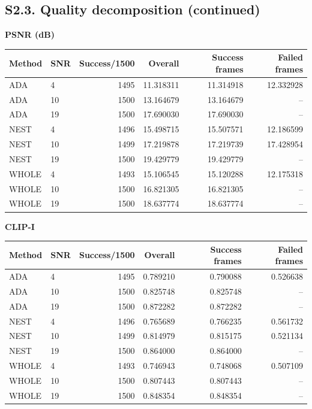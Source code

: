 \clearpage\subsection*{S2.3. Quality decomposition (continued)}
\textbf{PSNR (dB)}\begin{center}\small\begin{tabular}{llrrrr}\toprule Method & SNR & Success/1500 & Overall & Success frames & Failed frames\\\midrule
ADA & 4 & 1495 & 11.318311 & 11.314918 & 12.332928\\
ADA & 10 & 1500 & 13.164679 & 13.164679 & --\\
ADA & 19 & 1500 & 17.690030 & 17.690030 & --\\
NEST & 4 & 1496 & 15.498715 & 15.507571 & 12.186599\\
NEST & 10 & 1499 & 17.219878 & 17.219739 & 17.428954\\
NEST & 19 & 1500 & 19.429779 & 19.429779 & --\\
WHOLE & 4 & 1493 & 15.106545 & 15.120288 & 12.175318\\
WHOLE & 10 & 1500 & 16.821305 & 16.821305 & --\\
WHOLE & 19 & 1500 & 18.637774 & 18.637774 & --\\
\bottomrule\end{tabular}\end{center}
\textbf{CLIP-I}\begin{center}\small\begin{tabular}{llrrrr}\toprule Method & SNR & Success/1500 & Overall & Success frames & Failed frames\\\midrule
ADA & 4 & 1495 & 0.789210 & 0.790088 & 0.526638\\
ADA & 10 & 1500 & 0.825748 & 0.825748 & --\\
ADA & 19 & 1500 & 0.872282 & 0.872282 & --\\
NEST & 4 & 1496 & 0.765689 & 0.766235 & 0.561732\\
NEST & 10 & 1499 & 0.814979 & 0.815175 & 0.521134\\
NEST & 19 & 1500 & 0.864000 & 0.864000 & --\\
WHOLE & 4 & 1493 & 0.746943 & 0.748068 & 0.507109\\
WHOLE & 10 & 1500 & 0.807443 & 0.807443 & --\\
WHOLE & 19 & 1500 & 0.848354 & 0.848354 & --\\
\bottomrule\end{tabular}\end{center}
